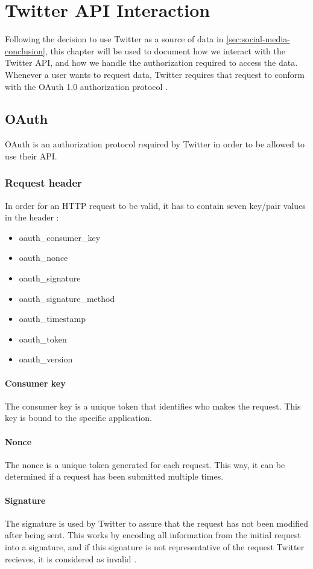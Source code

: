 \chapter{Twitter API Interaction}\label{cha:twitterAPI}
Following the decision to use Twitter as a source of data in
\autoref{sec:social-media-conclusion}, this chapter will be used to document how we interact
with the Twitter API, and how we handle the authorization required to access the
data. Whenever a user wants to request data, Twitter requires that request to
conform with the OAuth 1.0 authorization protocol \citep{OAuth1}.

\section{OAuth}
OAuth is an authorization protocol required by Twitter in order to be allowed to
use their \ac{API}.

\subsection{Request header}
In order for an \ac{HTTP} request to be valid, it has to
contain seven key/pair values in the header \citep{TwitterAPIAuth}:
\begin{itemize}
  \item oauth\_consumer\_key
  \item oauth\_nonce
  \item oauth\_signature
  \item oauth\_signature\_method
  \item oauth\_timestamp
  \item oauth\_token
  \item oauth\_version
\end{itemize}

\subsubsection*{Consumer key}
The consumer key is a unique token that identifies who makes the request.
This key is bound to the specific application.

\subsubsection*{Nonce}
The nonce is a unique token generated for each request. This way, it can be
determined if a request has been submitted multiple times. 

\subsubsection*{Signature}
The signature is used by Twitter to assure that the request has not been
modified after being sent. This works by encoding all information from the
initial request into a signature, and if this signature is not representative of
the request Twitter recieves, it is considered as invalid
\citep[sec 3.4]{OAuth1}.

